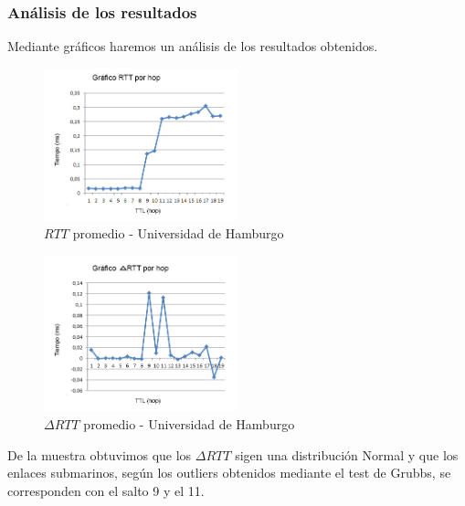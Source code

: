 \subsubsection{An\'alisis de los resultados}
Mediante gr\'aficos haremos un an\'alisis de los resultados obtenidos. \newline


\begin{figure}[h]
	\begin{center}
    \includegraphics[width=0.5\textwidth]{img_analisis3/grafico-rtt-promedio.jpg} 
    \caption{$RTT$ promedio - Universidad de Hamburgo}	
	\end{center} 
\end{figure}
\vspace{0.25cm}

\begin{figure}[h]
	\begin{center}
    \includegraphics[width=0.5\textwidth]{img_analisis3/grafico-delta-rtt-promedio.jpg} 
    \caption{$\Delta RTT$ promedio - Universidad de Hamburgo}	
	\end{center} 
\end{figure}
\vspace{0.25cm}
\newpage

De la muestra obtuvimos que los $\Delta RTT$ sigen una distribuci\'on Normal y que los enlaces submarinos, según los outliers obtenidos mediante el test de Grubbs, se corresponden con el salto 9 y el 11.\\

